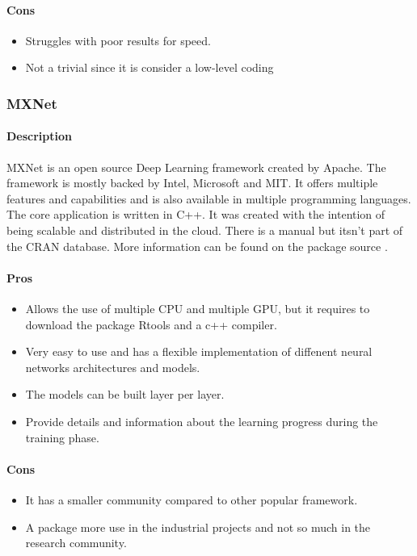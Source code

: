 \documentclass[letter,8pt]{article}\usepackage[]{graphicx}\usepackage[]{color}
\begin{document}
\paragraph{Cons}
\begin{itemize}
\item Struggles with poor results for speed.
\item Not a trivial since it is consider a low-level coding
\end{itemize}

\subsubsection{MXNet}
\paragraph{Description}
MXNet is an open source Deep Learning framework created by Apache. The framework is mostly backed by Intel, Microsoft and MIT. It offers multiple features and capabilities and is also available in multiple programming languages. The core application is written in C++. It was created with the intention of being scalable and distributed in the cloud. There is a manual but itsn't part of the CRAN database. More information can be found on the package source \cite{mxnet2020}.
\paragraph{Pros}
\begin{itemize}
\item Allows the use of multiple CPU and multiple GPU, but it requires to download the package Rtools and a c++ compiler.
\item Very easy to use and has a flexible implementation of diffenent neural networks architectures and models.
\item The models can be built layer per layer.
\item Provide details and information about the learning progress during the training phase.
\end{itemize}
\paragraph{Cons}
\begin{itemize}
\item It has a smaller community compared to other popular framework.
\item A package more use in the industrial projects and not so much in the research community.
\end{itemize}
\end{document}
